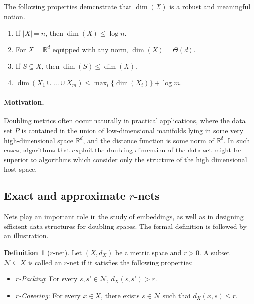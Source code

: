 \documentclass[10pt,a4paper,twoside]{book}
\newcommand{\rd}{\mathbb{R}^{d}}
\newcommand{\net}{\mathcal{N}}
\theoremstyle{definition}
\newtheorem{definition}{Definition}[chapter]
\theoremstyle{remark}
\begin{document}
The following properties demonstrate that $\dim(X)$ is a robust and meaningful notion.
\begin{enumerate} \itemsep0em
    \item If $|X|=n$, then $\dim(X) \leq \log n$.
    \item For $X=\rd$ equipped with any norm, $\dim(X) = \Theta(d)$.
    \item If $S \subseteq X$, then $\dim(S) \leq \dim(X)$.
    \item $\dim(X_1 \cup \ldots \cup X_m) \leq \max_i \{ \dim(X_i) \}+ \log m$.
\end{enumerate}

\paragraph{Motivation.} Doubling metrics often occur naturally in practical applications, where the data set $P$ is contained in the union of low-dimensional manifolds lying in some very high-dimensional space $\rd$, and the distance function is some norm of $\rd$. In such cases, algorithms that exploit the doubling dimension of the data set might be superior to algorithms which consider only the structure of the high dimensional host space. 

\subsection*{Exact and approximate \texorpdfstring{$r$}{r}-nets}
Nets play an important role in the study of embeddings, as well as in designing efficient data structures for doubling spaces. The formal definition is followed by an illustration.

\begin{definition} [$r$-net]
Let $(X, d_X)$ be a metric space and $r>0$. A subset $\net \subseteq X$ is called an $r$-net if it satisfies the following properties:
\begin{itemize} \itemsep0em
    \item {\em $r$-Packing}: For every $s, s' \in \net$, $d_X(s,s') > r$.
    \item {\em $r$-Covering}: For every $x \in X$, there exists $s \in \net$ such that $d_X(x,s) \leq r$. 
\end{itemize}
\end{definition}
\end{document}
